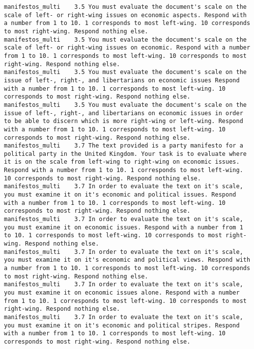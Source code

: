 \begin{lstlisting}[label=lst:promptvariants]
manifestos_multi	3.5	You must evaluate the document's scale on the scale of left- or right-wing issues on economic aspects. Respond with a number from 1 to 10. 1 corresponds to most left-wing. 10 corresponds to most right-wing. Respond nothing else.
manifestos_multi	3.5	You must evaluate the document's scale on the scale of left- or right-wing issues on economic. Respond with a number from 1 to 10. 1 corresponds to most left-wing. 10 corresponds to most right-wing. Respond nothing else.
manifestos_multi	3.5	You must evaluate the document's scale on the issue of left-, right-, and libertarians on economic issues Respond with a number from 1 to 10. 1 corresponds to most left-wing. 10 corresponds to most right-wing. Respond nothing else.
manifestos_multi	3.5	You must evaluate the document's scale on the issue of left-, right-, and libertarians on economic issues in order to be able to discern which is more right-wing or left-wing. Respond with a number from 1 to 10. 1 corresponds to most left-wing. 10 corresponds to most right-wing. Respond nothing else.
manifestos_multi	3.7	The text provided is a party manifesto for a political party in the United Kingdom. Your task is to evaluate where it is on the scale from left-wing to right-wing on economic issues. Respond with a number from 1 to 10. 1 corresponds to most left-wing. 10 corresponds to most right-wing. Respond nothing else.
manifestos_multi	3.7	In order to evaluate the text on it's scale, you must examine it on it's economic and political issues. Respond with a number from 1 to 10. 1 corresponds to most left-wing. 10 corresponds to most right-wing. Respond nothing else.
manifestos_multi	3.7	In order to evaluate the text on it's scale, you must examine it on economic issues. Respond with a number from 1 to 10. 1 corresponds to most left-wing. 10 corresponds to most right-wing. Respond nothing else.
manifestos_multi	3.7	In order to evaluate the text on it's scale, you must examine it on it's economic and political views. Respond with a number from 1 to 10. 1 corresponds to most left-wing. 10 corresponds to most right-wing. Respond nothing else.
manifestos_multi	3.7	In order to evaluate the text on it's scale, you must examine it on economic issues alone. Respond with a number from 1 to 10. 1 corresponds to most left-wing. 10 corresponds to most right-wing. Respond nothing else.
manifestos_multi	3.7	In order to evaluate the text on it's scale, you must examine it on it's economic and political stripes. Respond with a number from 1 to 10. 1 corresponds to most left-wing. 10 corresponds to most right-wing. Respond nothing else.

\end{lstlisting}
